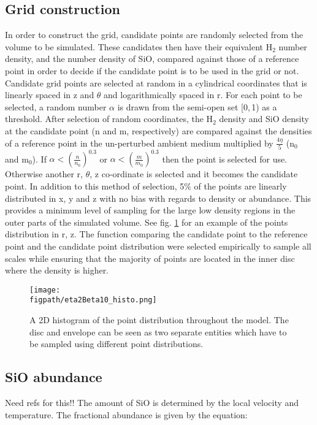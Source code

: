 \documentclass[useAMS,usenatbib,letters]{mn2e}
\newcommand{\figpath}{PFIGS/}
\begin{document}
\subsection{Grid construction} \label{subsec:gridding}
In order to construct the grid, candidate points are randomly selected from the volume to be simulated. These candidates then have their equivalent H$_2$ number density, and the number density of SiO, compared against those of a reference point in order to decide if the candidate point is to be used in the grid or not. Candidate grid points are selected at random in a cylindrical coordinates that is linearly spaced in z and $\theta$ and logarithmically spaced in r. For each point to be selected, a random number $\alpha$ is drawn from the semi-open set [0,$\,$1) as a threshold. After selection of random coordinates, the H$_2$ density and SiO density at the candidate point (n and m, respectively) are compared against the densities of a reference point in the un-perturbed ambient medium multiplied by $\frac{4\eta}{5}$ (n$_0$ and m$_0$). If $\alpha<\left( \frac{n}{n_0} \right)^{0.3}$ or $\alpha< \left( \frac{m}{m_0} \right)^{0.3}$ then the point is selected for use. Otherwise another r, $\theta$, z co-ordinate is selected and it becomes the candidate point. In addition to this method of selection, 5\% of the points are linearly distributed in x, y and z with no bias with regards to density or abundance. This provides a minimum level of sampling for the large low density regions in the outer parts of the simulated volume. See fig. \ref{points} for an example of the points distribution in r, z. The function comparing the candidate point to the reference point and the candidate point distribution were selected empirically to sample all scales while ensuring that the majority of points are located in the inner disc where the density is higher.  \smallskip

\begin{figure}
 \texttt{[image: \\figpath/eta2Beta10\_histo.png]}
 \caption{A 2D histogram of the point distribution throughout the model. The disc and envelope can be seen as two separate entities which have to be sampled using different point distributions.}
 \label{points}
\end{figure}

\subsection{SiO abundance}
Need refs for this!!\smallskip
The amount of SiO is determined by the local velocity and temperature. The fractional abundance is given by the equation:\smallskip
\end{document}

